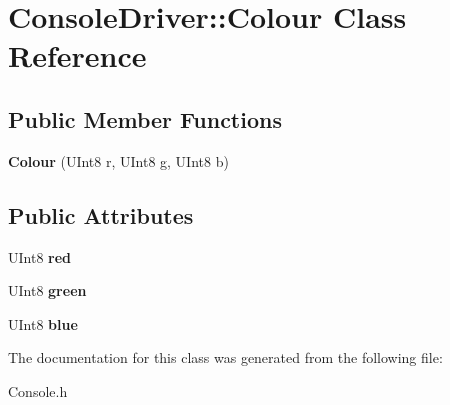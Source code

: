 \hypertarget{class_console_driver_1_1_colour}{}\section{Console\+Driver\+:\+:Colour Class Reference}
\label{class_console_driver_1_1_colour}
\subsection*{Public Member Functions}
\begin{DoxyCompactItemize}
\item 
\mbox{\label{class_console_driver_1_1_colour_a42162617488645335fac248ba5ef0e35}} 
{\bfseries Colour} (U\+Int8 r, U\+Int8 g, U\+Int8 b)
\end{DoxyCompactItemize}
\subsection*{Public Attributes}
\begin{DoxyCompactItemize}
\item 
\mbox{\label{class_console_driver_1_1_colour_a25b20b8c051038a6af1b2a2875a13267}} 
U\+Int8 {\bfseries red}
\item 
\mbox{\label{class_console_driver_1_1_colour_aa2a37b5f06665216658a2499b802a7bc}} 
U\+Int8 {\bfseries green}
\item 
\mbox{\label{class_console_driver_1_1_colour_a18ed342c4ec7b1e27c9190ec72618e83}} 
U\+Int8 {\bfseries blue}
\end{DoxyCompactItemize}


The documentation for this class was generated from the following file\+:\begin{DoxyCompactItemize}
\item 
Console.\+h\end{DoxyCompactItemize}
